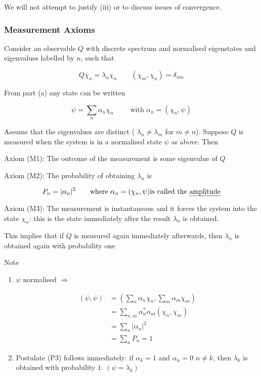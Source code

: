 \documentclass[a4paper]{article}
\begin{document}
We will not attempt to justify (iii) or to discuss issues of convergence.

\subsubsection{Measurement Axioms}

Consider an observable $ Q $ with discrete spectrum and normalised eigenstates and eigenvalues labelled by $ n $, such that

\[ Q \chi_{n} = \lambda_{n} \chi_{n} \qquad (\chi_{m},\chi_{n}) = \delta_{mn} \]

From part (a) any state can be written 

\[ \psi = \sum_{n} \alpha_{n} \chi_{n} \qquad \text{ with } \alpha_{n} = (\chi_{n},\psi) \]

Assume that the eigenvalues are distinct ( $ \lambda_{n} \neq \lambda_{m} $ for $ m \neq n $). Suppose $ Q $ is measured when the system is in a normalised state $ \psi $ as above. Then 

Axiom (M1): The outcome of the measurement is some eigenvalue of $ Q $

Axiom (M2): The probability of obtaining $ \lambda_{n} $ is

\[ P_{n} = | \alpha_{n} |^{2} \qquad \text{where } \alpha_{n} = (\chi_{n},\psi) \text{is called the \emph{amplitude}} \]

Axiom (M3): The measurement is instantaneous and it forces the system into  the state $ \chi_{n} $: this is the state immediately after the result $ \lambda_{n} $ is obtained.

This implies that if $ Q $ is measured again immediately afterwards, then $ \lambda_{n} $ is obtained again with probability one

Note

\begin{enumerate}
	\item $ \psi $ normalised $ \Rightarrow $
	
	\begin{align*}
	(\psi,\psi)& = (  \sum_{n} \alpha_{n} \chi_{n}, \sum_{m} \alpha_{m} \chi_{m} ) \\
	& = \sum_{n,m}  \alpha_{n}^{*}\alpha_{m} (\chi_{n},\chi_{m}) \\
	& = \sum_{n} | \alpha_{n} |^{2} \\
	& = \sum_{n} P_{n} = 1
	\end{align*}
	
	\item Postulate (P3) follows immediately: if $ \alpha_{k} = 1 $ and $ \alpha_{n} = 0 $ $ n \neq k $, then $ \lambda_{k} $ is obtained with probability $ 1 $. $ (\psi = \lambda_{k}) $
\end{enumerate}
\end{document}
